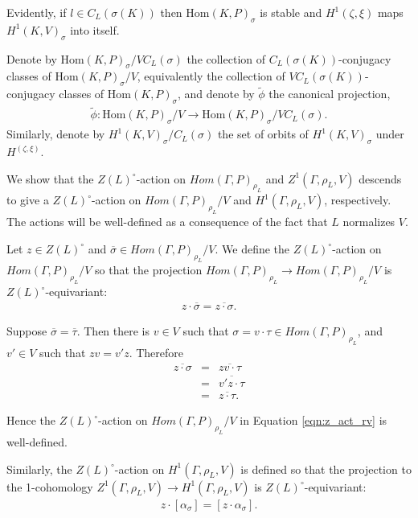 	Evidently, if $l \in C_L\left(\sigma(K)\right)$ then $\mathrm{Hom}(K, P)_\sigma$ is stable and $H^1(\zeta, \xi)$ maps $H^1(K, V)_{\sigma}$ into itself.
	\begin{definition}
		Denote by $\mathrm{Hom}(K, P)_\sigma/VC_L(\sigma)$ the collection of $C_L(\sigma(K))$-conjugacy classes of $\mathrm{Hom}(K, P)_\sigma/V$, equivalently the collection of $VC_L(\sigma(K))$-conjugacy classes of $\mathrm{Hom}(K, P)_\sigma$, and denote by $\widetilde{\phi}$ the canonical projection,
		\begin{eqnarray*}
			\widetilde{\phi}: \mathrm{Hom}(K, P)_\sigma/V \rightarrow \mathrm{Hom}(K, P)_\sigma/VC_L(\sigma).
		\end{eqnarray*}
		Similarly, denote by $H^1(K, V)_\sigma/C_L(\sigma)$ the set of orbits of $H^1(K, V)_\sigma$ under $H^(\zeta, \xi)$.
	\end{definition}

We show that the $Z(L)^\circ$-action on $Hom(\Gamma, P)_{\rho_L}$ and $Z^1(\Gamma, \rho_L, V)$ descends to give a $Z(L)^\circ$-action on $Hom(\Gamma, P)_{\rho_L}/V$ and $H^1(\Gamma, \rho_L, V)$, respectively. The actions will be well-defined as a consequence of the fact that $L$ normalizes $V$.

Let $z \in Z(L)^\circ$ and $\overline{\sigma} \in Hom(\Gamma, P)_{\rho_L}/V$. We define the $Z(L)^\circ$-action on $Hom(\Gamma, P)_{\rho_L}/V$ so that the projection $Hom(\Gamma, P)_{\rho_L} \rightarrow Hom(\Gamma, P)_{\rho_L}/V$ is $Z(L)^\circ$-equivariant:
\begin{eqnarray}
  z \cdot \overline{\sigma} = \overline{z \cdot \sigma}.
  \label{eqn:z_act_rv}
\end{eqnarray}

Suppose $\overline{\sigma} = \overline{\tau}$. Then there is $v \in V$ such that $\sigma = v \cdot \tau \in Hom(\Gamma, P)_{\rho_L}$, and $v' \in V$ such that $zv = v' z$. Therefore
\begin{eqnarray*}
  \overline{z \cdot \sigma} &=& \overline{zv \cdot \tau} \\
  &=& \overline{v' z \cdot \tau} \\
  &=& \overline{z \cdot \tau}.
\end{eqnarray*}

Hence the $Z(L)^\circ$-action on $Hom(\Gamma, P)_{\rho_L}/V$ in Equation \ref{eqn:z_act_rv} is well-defined.

Similarly, the $Z(L)^\circ$-action on $H^1(\Gamma, \rho_L, V)$ is defined so that the projection to the 1-cohomology $Z^1(\Gamma, \rho_L, V) \rightarrow H^1(\Gamma, \rho_L, V)$ is $Z(L)^\circ$-equivariant:
\begin{eqnarray}
  z \cdot [\alpha_\sigma] = [z \cdot \alpha_\sigma].
  \label{eqn:z_act_h}
\end{eqnarray}

